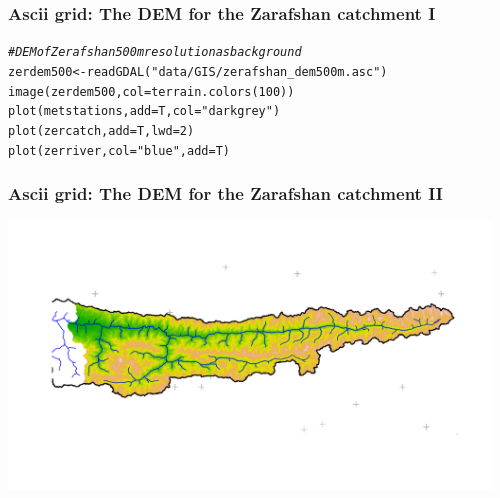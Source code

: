 \documentclass[xcolor=table, xcolor=dvipsnames]{beamer}\usepackage[]{graphicx}\usepackage[]{color}
\makeatletter
\newcommand{\hlnum}[1]{\textcolor[rgb]{0,0,0}{#1}}
\newcommand{\hlstr}[1]{\textcolor[rgb]{0.545,0.137,0.137}{#1}}
\newcommand{\hlcom}[1]{\textcolor[rgb]{0,0.392,0}{\textit{#1}}}
\newcommand{\hlstd}[1]{\textcolor[rgb]{0,0,0}{#1}}
\newcommand{\hlkwb}[1]{\textcolor[rgb]{0,0,0}{#1}}
\newcommand{\hlkwc}[1]{\textcolor[rgb]{1,0,1}{#1}}
\newcommand{\hlkwd}[1]{\textcolor[rgb]{0,0,1}{#1}}
\newenvironment{kframe}{%
 \def\at@end@of@kframe{}%
 \ifinner\ifhmode%
  \def\at@end@of@kframe{\end{minipage}}%
  \begin{minipage}{\columnwidth}%
 \fi\fi%
 \def\FrameCommand##1{\hskip\@totalleftmargin \hskip-\fboxsep
 \colorbox{shadecolor}{##1}\hskip-\fboxsep
     \hskip-\linewidth \hskip-\@totalleftmargin \hskip\columnwidth}%
 \MakeFramed {\advance\hsize-\width
   \@totalleftmargin\z@ \linewidth\hsize
   \@setminipage}}%
 {\par\unskip\endMakeFramed%
 \at@end@of@kframe}
\newenvironment{knitrout}{}{} %
\makeatother
\begin{document}

\begin{frame}[fragile]\frametitle{Ascii grid: The DEM for the Zarafshan catchment I}
\begin{knitrout}
\color{fgcolor}\begin{kframe}
\begin{alltt}
\hlcom{# DEM of Zerafshan 500m resolution as background}
\hlstd{zerdem500} \hlkwb{<-} \hlkwd{readGDAL}\hlstd{(}\hlstr{"data/GIS/zerafshan_dem500m.asc"}\hlstd{)}
\hlkwd{image}\hlstd{(zerdem500,} \hlkwc{col}\hlstd{=}\hlkwd{terrain.colors}\hlstd{(}\hlnum{100}\hlstd{))}
\hlkwd{plot}\hlstd{(metstations,} \hlkwc{add}\hlstd{=T,} \hlkwc{col}\hlstd{=}\hlstr{"darkgrey"}\hlstd{)}
\hlkwd{plot}\hlstd{(zercatch,} \hlkwc{add}\hlstd{=T,} \hlkwc{lwd}\hlstd{=}\hlnum{2}\hlstd{)}
\hlkwd{plot}\hlstd{(zerriver,} \hlkwc{col}\hlstd{=}\hlstr{"blue"}\hlstd{,} \hlkwc{add}\hlstd{=T)}
\end{alltt}
\end{kframe}
\end{knitrout}
\end{frame}


\begin{frame}[fragile]\frametitle{Ascii grid: The DEM for the Zarafshan catchment II}
\begin{center}
\includegraphics[width=0.96\textwidth]{./externalfig/Zerafshan_DEM_import1.pdf}
\end{center}
\end{frame}

\end{document}
